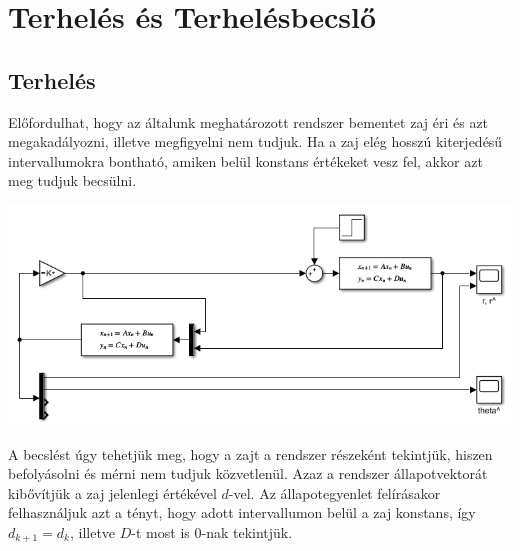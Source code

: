 \documentclass{article}
\begin{document}
\section{Terhelés és Terhelésbecslő}
    \subsection{Terhelés}
        Előfordulhat, hogy az általunk meghatározott rendszer bementet zaj éri és azt megakadályozni, illetve megfigyelni nem tudjuk. Ha a zaj elég hosszú kiterjedésű intervallumokra bontható, amiken belül konstans értékeket vesz fel, akkor azt meg tudjuk becsülni.

        \begin{center}
            \includegraphics[width=\linewidth]{asset/d.png}
        \end{center}
        
        A becslést úgy tehetjük meg, hogy a zajt a rendszer részeként tekintjük, hiszen befolyásolni és mérni nem tudjuk közvetlenül. Azaz a rendszer állapotvektorát kibővítjük a zaj jelenlegi értékével $d$-vel. Az állapotegyenlet felírásakor felhasználjuk azt a tényt, hogy adott intervallumon belül a zaj konstans, így $d_{k+1} = d_k$, illetve $D$-t most is 0-nak tekintjük.
\end{document}
